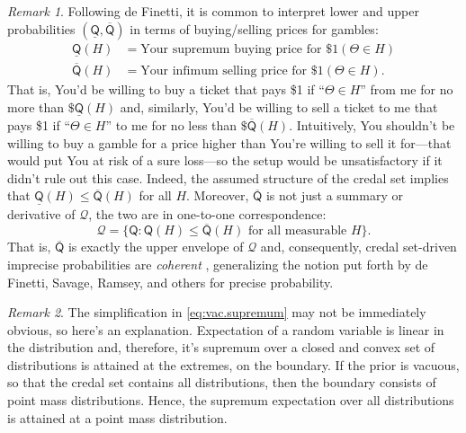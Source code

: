 \documentclass[a4paper, 12pt]{article}
\theoremstyle{plain}
\theoremstyle{definition}
\theoremstyle{remark}
\newtheorem{remark}{Remark}
\newcommand{\prior}{\mathsf{Q}}
\newcommand{\credal}{\mathscr{Q}}
\newcommand{\lprior}{\underline{\mathsf{Q}}}
\newcommand{\uprior}{\overline{\mathsf{Q}}}
\begin{document}
\begin{remark}
\label{re:betting}
Following de Finetti, it is common to interpret lower and upper probabilities $(\lprior,\uprior)$ in terms of buying/selling prices for gambles:
\begin{equation}
\label{eq:prices}
\begin{split}
\lprior(H) & = \text{Your supremum buying price for $\$1(\Theta \in H)$} \\
\uprior(H) & = \text{Your infimum selling price for $\$1(\Theta \in H)$}.
\end{split}
\end{equation}
That is, You'd be willing to buy a ticket that pays \$1 if ``$\Theta \in H$'' from me for no more than $\$\lprior(H)$ and, similarly, You'd be willing to sell a ticket to me that pays \$1 if ``$\Theta \in H$'' to me for no less than $\$\uprior(H)$.  Intuitively, You shouldn't be willing to buy a gamble for a price higher than You're willing to sell it for---that would put You at risk of a sure loss---so the setup would be unsatisfactory if it didn't rule out this case.  Indeed, the assumed structure of the credal set implies that $\lprior(H) \leq \uprior(H)$ for all $H$.  Moreover, $\uprior$ is not just a summary or derivative of $\credal$, the two are in one-to-one correspondence:
\begin{equation}
\label{eq:credal}
\credal = \{\prior: \prior(H) \leq \uprior(H) \text{ for all measurable $H$} \}. 
\end{equation}
That is, $\uprior$ is exactly the upper envelope of $\credal$ and, consequently, credal set-driven imprecise probabilities are {\em coherent} \citep[e.g.,][]{walley1991}, generalizing the notion put forth by de Finetti, Savage, Ramsey, and others for precise probability.
\end{remark}

\begin{remark}
\label{re:vac.supremum}
The simplification in \eqref{eq:vac.supremum} may not be immediately obvious, so here's an explanation.  Expectation of a random variable is linear in the distribution and, therefore, it's supremum over a closed and convex set of distributions is attained at the extremes, on the boundary.  If the prior is vacuous, so that the credal set contains all distributions, then the boundary consists of point mass distributions. Hence, the supremum expectation over all distributions is attained at a point mass distribution.
\end{remark}
\end{document}
